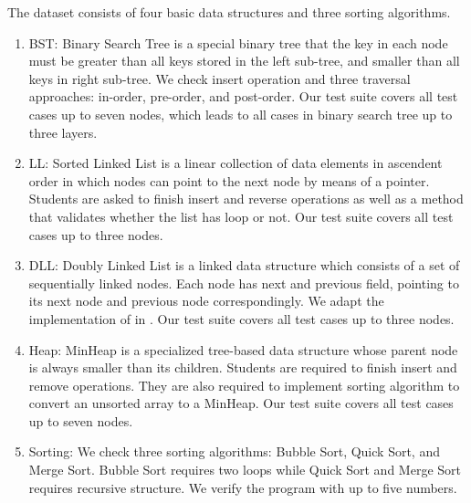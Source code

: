  The dataset consists of  four basic data structures and three sorting algorithms.  
\begin{enumerate}
\item BST: Binary Search Tree  is a special binary tree that the key in each node must be greater than all keys stored in the left sub-tree, and smaller than all keys in right sub-tree. We check insert operation and three traversal approaches: in-order, pre-order, and post-order. Our test suite covers all test cases up to seven nodes, which leads to all cases in binary search tree up to three layers.  
\item LL: Sorted Linked List  is a linear collection of data elements in ascendent order in which  nodes can point to the next node by means of a pointer. 
Students are asked to finish insert and reverse operations as well as a method that validates whether the list has loop or not.  Our test suite covers all test cases up to three nodes.  
\item DLL: Doubly Linked List  is a linked data structure which consists of a set of sequentially linked nodes. Each node has next and previous field, pointing to its next node and previous node correspondingly. We adapt the implementation of  in . 
Our test suite covers all test cases up to three nodes.  

\item Heap: MinHeap is a specialized tree-based data structure whose parent node is always smaller than its children. Students are required to finish insert and remove operations. They are also required to implement sorting algorithm to convert an unsorted array to a MinHeap. Our test suite covers all test cases up to seven nodes.

\item Sorting: We check three sorting algorithms: Bubble Sort, Quick Sort, and Merge Sort. Bubble Sort requires two loops while Quick Sort and Merge Sort requires recursive structure. We verify the program with up to five numbers.  

\end{enumerate}

